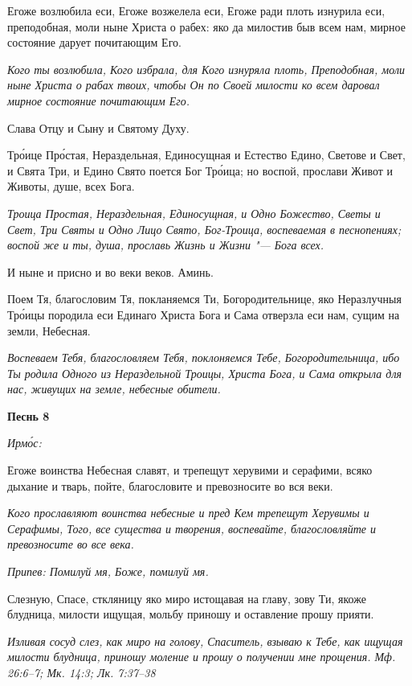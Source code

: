 Егоже возлюбила еси, Егоже возжелела еси, Егоже ради плоть изнурила еси, преподобная, моли ныне Христа о рабех: яко да милостив быв всем нам, мирное состояние дарует почитающим Его.


\itshape Кого ты возлюбила, Кого избрала, для Кого изнуряла плоть, Преподобная, моли ныне Христа о рабах твоих, чтобы Он по Своей милости ко всем даровал мирное состояние почитающим Его.\normalfont{}


Слава Отцу и Сыну и Святому Духу.


Тро́ице Про́стая, Нераздельная, Единосущная и Естество Едино, Светове и Свет, и Свята Три, и Едино Свято поется Бог Тро́ица; но воспой, прослави Живот и Животы, душе, всех Бога.


\itshape Троица Простая, Нераздельная, Единосущная, и Одно Божество, Светы и Свет, Три Святы и Одно Лицо Свято, Бог-Троица, воспеваемая в песнопениях; воспой же и ты, душа, прославь Жизнь и Жизни "--- Бога всех.\normalfont{}


И ныне и присно и во веки веков. Аминь.


Поем Тя, благословим Тя, покланяемся Ти, Богородительнице, яко Неразлучныя Тро́ицы породила еси Единаго Христа Бога и Сама отверзла еси нам, сущим на земли, Небесная.


\itshape Воспеваем Тебя, благословляем Тебя, поклоняемся Тебе, Богородительница, ибо Ты родила Одного из Нераздельной Троицы, Христа Бога, и Сама открыла для нас, живущих на земле, небесные обители.\normalfont{}





\bfseries Песнь 8\normalfont{}


\itshape Ирмо́с:\normalfont{}


Егоже воинства Небесная славят, и трепещут херувими и серафими, всяко дыхание и тварь, пойте, благословите и превозносите во вся веки.


\itshape Кого прославляют воинства небесные и пред Кем трепещут Херувимы и Серафимы, Того, все существа и творения, воспевайте, благословляйте и превозносите во все века.\normalfont{}


\itshape Припев:\normalfont{} Помилуй мя, Боже, помилуй мя.


Слезную, Спасе, сткляницу яко миро истощавая на главу, зову Ти, якоже блудница, милости ищущая, мольбу приношу и оставление прошу прияти.


\itshape Изливая сосуд слез, как миро на голову, Спаситель, взываю к Тебе, как ищущая милости блудница, приношу моление и прошу о получении мне прощения. Мф. 26:6–7; Мк. 14:3; Лк. 7:37–38\normalfont{}


